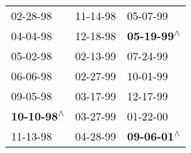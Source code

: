 \begin{supertabular}{lll}
                  02-28-98\textsuperscript{} &  11-14-98\textsuperscript{} &                   05-07-99\textsuperscript{} \\
                  04-04-98\textsuperscript{} &  12-18-98\textsuperscript{} &  \textbf{05-19-99\textsuperscript{$\wedge$}} \\
                  05-02-98\textsuperscript{} &  02-13-99\textsuperscript{} &                   07-24-99\textsuperscript{} \\
                  06-06-98\textsuperscript{} &  02-27-99\textsuperscript{} &                   10-01-99\textsuperscript{} \\
                  09-05-98\textsuperscript{} &  03-17-99\textsuperscript{} &                   12-17-99\textsuperscript{} \\
 \textbf{10-10-98\textsuperscript{$\wedge$}} &  03-27-99\textsuperscript{} &                   01-22-00\textsuperscript{} \\
                  11-13-98\textsuperscript{} &  04-28-99\textsuperscript{} &  \textbf{09-06-01\textsuperscript{$\wedge$}} \\
\end{supertabular}
